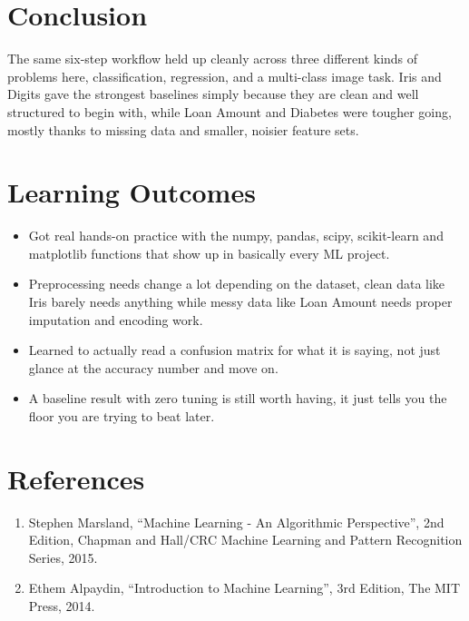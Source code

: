 \documentclass[12pt,a4paper]{article}
\begin{document}
\section{Conclusion}
The same six-step workflow held up cleanly across three different kinds of problems here, classification,
regression, and a multi-class image task. Iris and Digits gave the strongest baselines simply because
they are clean and well structured to begin with, while Loan Amount and Diabetes were tougher going,
mostly thanks to missing data and smaller, noisier feature sets.

\section{Learning Outcomes}
\begin{itemize}
\item Got real hands-on practice with the numpy, pandas, scipy, scikit-learn and matplotlib functions
that show up in basically every ML project.
\item Preprocessing needs change a lot depending on the dataset, clean data like Iris barely needs
anything while messy data like Loan Amount needs proper imputation and encoding work.
\item Learned to actually read a confusion matrix for what it is saying, not just glance at the
accuracy number and move on.
\item A baseline result with zero tuning is still worth having, it just tells you the floor you are
trying to beat later.
\end{itemize}

\section{References}
\begin{enumerate}
\item Stephen Marsland, ``Machine Learning - An Algorithmic Perspective'', 2nd Edition, Chapman and
Hall/CRC Machine Learning and Pattern Recognition Series, 2015.
\item Ethem Alpaydin, ``Introduction to Machine Learning'', 3rd Edition, The MIT Press, 2014.
\end{enumerate}
\end{document}
